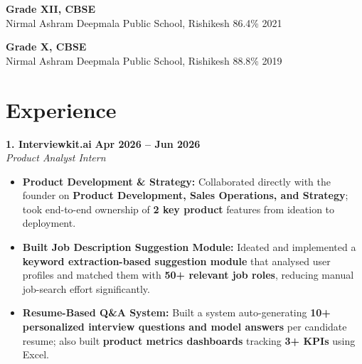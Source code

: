 \documentclass[9pt]{article}
\begin{document}
{\noindent \bf Grade XII, CBSE} \\
Nirmal Ashram Deepmala Public School, Rishikesh \hfill {86.4\% \hspace{3.6cm} 2021}

{\noindent \bf Grade X, CBSE} \\
Nirmal Ashram Deepmala Public School, Rishikesh \hfill {88.8\% \hspace{3.6cm} 2019}



\section*{Experience}
\noindent \textbf{1. Interviewkit.ai} \hfill \textbf{Apr 2026 -- Jun 2026} \\
\textit{Product Analyst Intern}
{\small

\begin{itemize}[leftmargin=*, nosep, topsep=1.5pt, itemsep=0.5pt]

    \item \textbf{Product Development \& Strategy:} Collaborated directly with the founder on \textbf{Product Development, Sales Operations, and Strategy}; took end-to-end ownership of \textbf{2 key product} features from ideation to deployment.

    \item \textbf{Built Job Description Suggestion Module:} Ideated and implemented a \textbf{keyword extraction-based suggestion module} that analysed user profiles and matched them with \textbf{50+ relevant job roles}, reducing manual job-search effort significantly.
    
    \item \textbf{Resume-Based Q\&A System:} Built a system auto-generating \textbf{10+ personalized interview questions and model answers} per candidate resume; also built \textbf{product metrics dashboards} tracking \textbf{3+ KPIs} using Excel.
\end{itemize}
}
\vspace{2pt}
\end{document}
